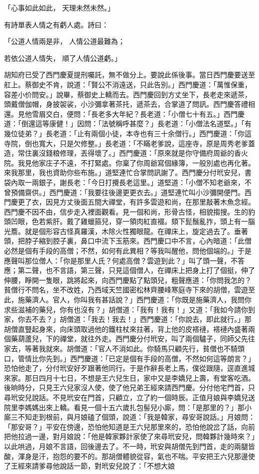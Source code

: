 \begin{showcontents}{}
「心事如此如此，  天理未然未然。」

有詩單表人情之有虧人處。詩曰：

「公道人情兩是非，  人情公道最難為；

若依公道人情失，  順了人情公道虧。」

胡知府已受了西門慶夏提刑囑託，無不做分上。要說此係後事。當日西門慶要送至舡上。蔡御史不肯，說道：「賢公不消遠送，只此告別。」西門慶道：「萬惟保重，容差小价問安。」說畢，蔡御史上轎而去。西門慶回到方丈坐下，長老走來遞茶，頭戴僧伽帽，身披袈裟，小沙彌拿著茶托，遞茶去，合掌道了問訊。西門慶答禮相還。見他雪眉交白，便問：「長老多大年紀？長老道：「小僧七十有五。」西門慶道：「倒還這等康健！」因問：「法號稱呼甚麼？」長老道：「小僧法名道堅。」「有幾位徒弟？」長老道：「止有兩個小徒，本寺也有三十余僧行。」西門慶道：「你這寺院，倒也寬大，只是欠修整。」長老道：「不瞞老爹說，這座寺，原是周秀老爹蓋造，常住裏沒錢粮修理，丟得壞了。」西門慶道：「原來就是你守備府周爺的香火院。我見他家庄子不遠，不打緊處。你稟了你周爺寫個緣簿，一般別處也再化著。來我那里，我也資助你些布施。」道堅連忙合掌問訊謝了。西門慶分付玳安兒，書袋內取一兩銀子，謝長老：「今日打攪長老這里。」道堅道：「小僧不知老爺來，不曾預備齋供。」西門慶道：「我要往後邊更更衣去。」道堅連忙叫小沙彌開便門。西門慶更了衣，因見方丈後面五間大禪堂，有許多雲遊和尚，在那里敲著木魚念經。西門慶不因不由，信步走入裡面觀看。見一個和尚，形骨古怪，相貌搊搜。生的豹頭凹眼，色若紫肝。戴了雞蠟箍兒，穿一領肉紅直裰。頦下髭鬚亂拃，頭上有一腦光簷。就是個形容古怪真羅漢，木除火性獨眼龍。在禪床上，旋定過去了。垂著頭，把脖子縮到腔子裏，鼻口中流下玉筋來。西門慶口中不言，心內暗道：「此僧必然是個有手段的高僧；不然，如何有此異相？等我叫醒他，問他個端的。」于是應聲叫那位僧人：「你是那里人氏？何處高僧？雲遊到此？」叫了頭一聲，不答應；第二聲，也不言語，第三聲，只見這個僧人，在禪床上把身上打了個挺，伸了伸腰，睜開一隻眼，跳將起來，向西門慶點了點頭兒，粗聲應道：「你問我怎的？貧僧行不問名，坐不改姓，乃西域天竺國密松林齊腰峰寒庭寺下來的胡僧，雲遊至此，施藥濟人。官人，你叫我有甚話說？」西門慶道：「你既是施藥濟人，我問你求些滋補的藥兒，你有也沒有？」胡僧道：「我有！我有！」又道：「我如今請你到家，你去不去？」胡僧道：「我去！我去！」西門慶道：「你說去，即此就行。」那胡僧直豎起身來，向床頭取過他的鐵柱杖來拄著，背上他的皮褡褳，褡褳內盛著兩個藥葫蘆兒，下的禪堂，就往外走。西門慶分付玳安，叫了兩個驢子，同師父先往家去，等著我就來。胡僧道：「官人不消如此。你騎馬只顧先行，貧僧也不騎頭口，管情比你先到。」西門慶道：「已定是個有手段的高僧，不然如何這等朗言？」恐怕他走了，分付玳安好歹跟著他同行。于是作辭長老上馬，僕從跟隨，逕直進城來家。那日四月十七日，不想是王六兒生日，家中又是李嬌兒上壽，有堂客吃酒。後晌時分，只見王六兒家沒人使，使了他兄弟王經來請西門慶。分付他宅門首，只尋玳安兒說話。不見玳安在門首，只顧立，立了約一個時辰。正值月娘與李嬌兒送院里李媽媽出來上轎。看見一個十五六歲扎包髻兒小廝，問：「是那里的？」那小廝三不知走到根前，與月娘磕了個頭，說道：「我是韓家，尋安哥說話。」月娘問：「那安哥？」平安在傍邊，恐怕他知道是王六兒那里來的，恐怕他說岔了話，向前把他拉過一邊，對月娘說：「他是韓家夥計家使了來尋玳安兒，問韓夥計幾時來？」以此哄過，月娘不言語，回後邊去了。不一時，玳安與胡僧先到門首，走的兩腿皆酸，渾身是汗，抱怨的要不的。那胡僧體貌從容，氣也不喘。平安把王六兒那邊使了王經來請爹尋他說話一節，對玳安兒說了：「不想大娘
\end{showcontents}
